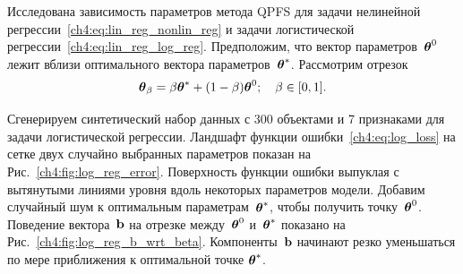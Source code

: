 Исследована зависимость параметров метода QPFS для задачи нелинейной регрессии~\eqref{ch4:eq:lin_reg_nonlin_reg} и задачи логистической регрессии~\eqref{ch4:eq:lin_reg_log_reg}. 
Предположим, что вектор параметров~$\boldsymbol{\theta}^0$ лежит вблизи оптимального вектора параметров~$\boldsymbol{\theta}^*$. 
Рассмотрим отрезок
\[
	\boldsymbol{\theta}_{\beta} = \beta \boldsymbol{\theta}^* + (1 - \beta) \boldsymbol{\theta}^0; \quad \beta \in [0, 1] .
\]

Сгенерируем синтетический набор данных с 300 объектами и 7 признаками для задачи логистической регрессии. 
Ландшафт функции ошибки~\eqref{ch4:eq:log_loss} на сетке двух случайно выбранных параметров показан на Рис.~\ref{ch4:fig:log_reg_error}.
Поверхность функции ошибки выпуклая с вытянутыми линиями уровня вдоль некоторых параметров модели.
Добавим случайный шум к оптимальным параметрам~$\boldsymbol{\theta}^*$, чтобы получить точку~$\boldsymbol{\theta}^0$. Поведение вектора~$\mathbf{b}$ на отрезке между~$\boldsymbol{\theta}^0$ и~$\boldsymbol{\theta}^*$ показано на Рис.~\ref{ch4:fig:log_reg_b_wrt_beta}.
Компоненты~$\mathbf{b}$ начинают резко уменьшаться по мере приближения к оптимальной точке $\boldsymbol{\theta}^*$.
